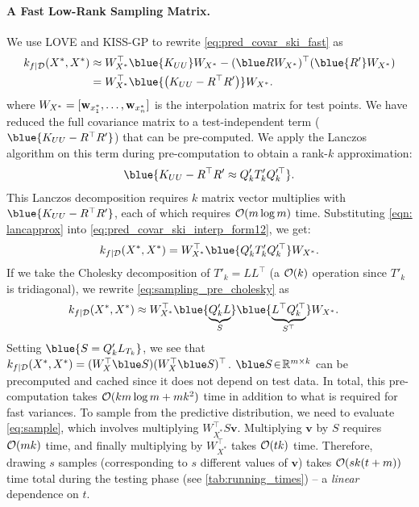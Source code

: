 \paragraph{A Fast Low-Rank Sampling Matrix.} We use LOVE{} and KISS-GP to rewrite \eqref{eq:pred_covar_ski_fast} as
%
\begin{align}
  k_{f \mid \dset} (\bX^*, \bX^*)
  &\approx \bW^\top_{X^*} \blue{K_{UU}} W_{X^*} - (\blue \bR \bW_{X^*})^\top (\blue{\bR'} \bW_{\bXtest})
    \notag \\
    &= \bW^\top_{\bX^*} \blue{\left( \bK_{UU} - \bR^\top \bR' \right)} \bW_{X^*}.
    \label{eq:pred_covar_ski_interp_form12}
\end{align}
%
where $W_{X^*} = [\mathbf{w}_{x^*_1}, \ldots, \mathbf{w}_{x^*_n}]$ is the interpolation matrix for test points.
We have reduced the full covariance matrix to a test-independent term ($\blue{ K_{UU} - R^\top R' }$) that can be pre-computed.
We apply the Lanczos algorithm on this term during pre-computation to obtain a rank-$k$ approximation:
%
\begin{align}
  \blue{K_{UU} - R^\top R' \approx Q'_k T'_k Q_k^{\prime\top} }.
  \label{eqn: lancapprox}
\end{align}
%
This Lanczos decomposition requires $k$ matrix vector multiplies with $\blue{ K_{UU} - R^{\top}R' }$, each of which requires $\bigo{m \log m}$ time.
Substituting \eqref{eqn: lancapprox} into \eqref{eq:pred_covar_ski_interp_form12}, we get:
%
\begin{align}
  k_{f \mid \dset} (\bX^*, \bX^*) = W^\top_{X^*} \blue{Q'_{k}T'_{k}Q_{k}^{\prime\top}} W_{X^*}.
  \label{eq:sampling_pre_cholesky}
\end{align}
If we take the Cholesky decomposition of $T'_k = \!L L^\top$ (a $\bigo{k}$ operation since $T'_{k}$ is tridiagonal), we rewrite \eqref{eq:sampling_pre_cholesky} as
%
\begin{align}
  k_{f \mid \dset} (\bX^*, \bX^*)
  &\approx  W^\top_{X^*} \blue{\underbrace{Q'_k L}_{S}} \blue{\underbrace{L^\top Q_k^{\prime\top}}_{S^\top}} W_{X^*}.
    \label{eq:pred_covar_ski_interp_form}
\end{align}
%
Setting $\blue{ S= Q'_k L_{T_k} }$, we see that $k_{f \mid \dset} (\bX^*, \bX^*) = (W_X^\top \blue S)(W_X^\top \blue S)^{\top}$.
$\blue S \! \in \! \reals^{m \times k}$ can be precomputed and cached since it does not depend on test data.
In total, this pre-computation takes $\bigo{k m \log m + m k^2}$ time in addition to what is required for fast variances.
To sample from the predictive distribution, we need to evaluate \eqref{eq:sample}, which involves multiplying $W^\top_{X^*} S \mathbf{v}$.
Multiplying $\mathbf{v}$ by $S$ requires $\bigo{mk}$ time, and finally multiplying by $W^{\top}_{X^{*}}$ takes $\bigo{tk}$ time.
Therefore, drawing $s$ samples (corresponding to $s$ different values of $\mathbf{v}$) takes $\bigo{sk(t + m)}$ time total during the testing phase (see \autoref{tab:running_times}) -- a \emph{linear} dependence on $t$.

